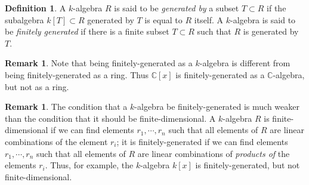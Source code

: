\documentclass [12pt,oneside,a4paper,mathscr]{amsart}
\theoremstyle{definition}
\newtheorem{defn}[thm]{Definition}
\newtheorem{remark}[thm]{Remark}
\newcommand {\C}{\mathbb C}
\begin{document}
\begin{defn}
A $k$-algebra $R$ is said to be \emph{generated by} a subset $T\subset R$ if the subalgebra $k[T]\subset R$ generated by $T$ is equal to $R$ itself. A $k$-algebra is said to be \emph{finitely generated} if there is a finite subset $T\subset R$ such that $R$ is generated by $T$.
\end{defn}

\begin{remark}
Note that being finitely-generated as a $k$-algebra is different from being finitely-generated as a ring. Thus $\C[x]$ is finitely-generated as a $\C$-algebra, but not as a ring.
\end{remark}

\begin{remark}The condition that a $k$-algebra be finitely-generated is much weaker than the condition
that it should be finite-dimensional. A $k$-algebra $R$ is finite-dimensional if we can find elements
 $r_1,\cdots,r_n$ such that all elements of $R$ are linear combinations of  the element $r_i$; it is finitely-generated if we can find elements $r_1,\cdots, r_n$ such that all elements of $R$ are linear combinations of \emph{products of} the elements $r_i$.
Thus, for example, the $k$-algebra $k[x]$ is finitely-generated, but not finite-dimensional. \end{remark}

\end{document}
